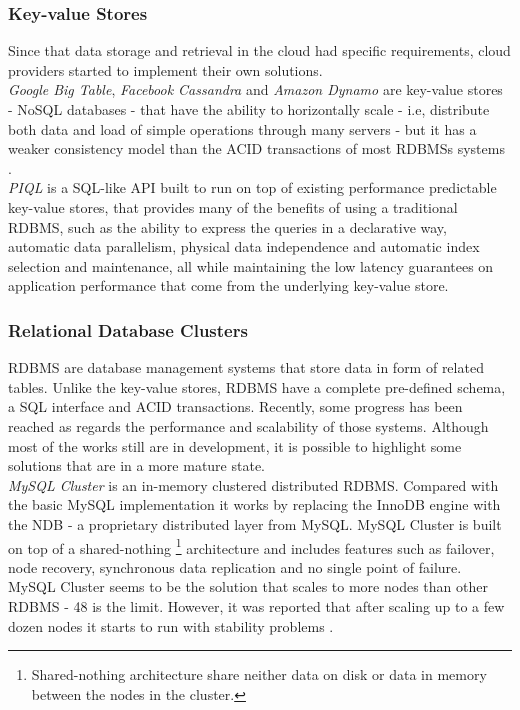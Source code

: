 \subsubsection{Key-value Stores}
\label{subs:kv-stores}
Since that data storage and retrieval in the cloud had specific requirements, cloud providers started
to implement their own solutions.\\

\textit{Google Big Table}, \textit{Facebook Cassandra} and \textit{Amazon Dynamo} \cite{chang2008bigtable} \cite{lakshman2010cassandra}
\cite{decandia2007dynamo} are key-value stores - \gls{NoSQL} databases - that have the ability to horizontally scale - i.e,
distribute both data and load of simple operations through many servers - but it has a weaker consistency
model than the ACID transactions of most \glspl{RDBMS} systems \cite{cattell2011scalable}.\\

\textit{\gls{PIQL}} \cite{armbrust2010piql} is a SQL-like API built to run on top of existing
performance predictable key-value stores, that provides many of the benefits of using a traditional
\gls{RDBMS}, such as the ability to express the queries in a declarative way, automatic data
parallelism, physical data independence and automatic index selection and maintenance, all while
maintaining the low latency guarantees on application performance that come from the underlying
key-value store.

\subsubsection{Relational Database Clusters}
\label{subs:rdbms_clusters}
\glsdesc{RDBMS} are database management systems that store data in form of related tables. Unlike
the key-value stores, \gls{RDBMS} have a complete pre-defined schema, a SQL interface and ACID
transactions. Recently, some progress has been reached as regards the performance and scalability of
those systems. Although most of the works still are in development, it is possible to highlight some
solutions that are in a more mature state.\\

\textit{MySQL Cluster} \cite{ronstrom2004mysql} is an in-memory clustered distributed \gls{RDBMS}.
Compared with the basic MySQL implementation it works by replacing the InnoDB engine with the NDB - a
proprietary distributed layer from MySQL. MySQL Cluster is built on top of a shared-nothing
\footnote{Shared-nothing architecture share neither data on disk or data in memory between the nodes in the cluster.}
architecture and includes features such as failover, node recovery, synchronous data replication and
no single point of failure. MySQL Cluster seems to be the solution that scales to more nodes than
other \gls{RDBMS} - 48 is the limit. However, it was reported that after scaling up to a few dozen
nodes it starts to run with stability problems \cite{bunch2010evaluation}.\\

